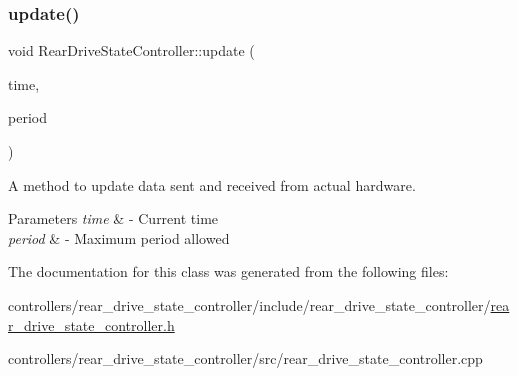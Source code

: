 \subsubsection{\texorpdfstring{update()}{update()}}
{\footnotesize\ttfamily void Rear\+Drive\+State\+Controller\+::update (\begin{DoxyParamCaption}\item[{const ros\+::\+Time \&}]{time,  }\item[{const ros\+::\+Duration \&}]{period }\end{DoxyParamCaption})}



A method to update data sent and received from actual hardware. 


\begin{DoxyParams}{Parameters}
{\em time} & -\/ Current time \\
\hline
{\em period} & -\/ Maximum period allowed \\
\hline
\end{DoxyParams}


The documentation for this class was generated from the following files\+:\begin{DoxyCompactItemize}
\item 
controllers/rear\+\_\+drive\+\_\+state\+\_\+controller/include/rear\+\_\+drive\+\_\+state\+\_\+controller/\hyperlink{rear__drive__state__controller_8h}{rear\+\_\+drive\+\_\+state\+\_\+controller.\+h}\item 
controllers/rear\+\_\+drive\+\_\+state\+\_\+controller/src/rear\+\_\+drive\+\_\+state\+\_\+controller.\+cpp\end{DoxyCompactItemize}
